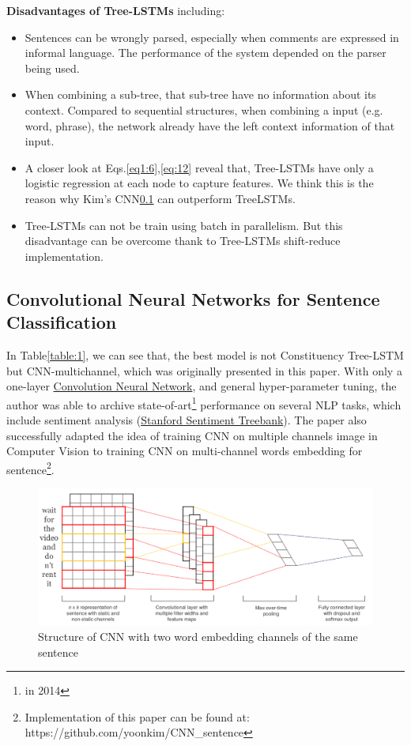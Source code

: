 \textbf{Disadvantages of Tree-LSTMs} including:\label{treelstm-drawback}
\begin{itemize}
\item Sentences can be wrongly parsed, especially when comments are expressed in informal language.
The performance of the system depended on the parser being used.
\item When combining a sub-tree, that sub-tree have no information about its context. 
Compared to sequential structures, when combining a input (e.g. word, phrase), the network already have the left context information of that input\cite{shift-reduce}.
\item A closer look at Eqs.\eqref{eq1:6},\eqref{eq:12} reveal that, Tree-LSTMs have only a logistic regression at each node to capture features.
We think this is the reason why Kim's CNN\ref{kim-cnn} can outperform TreeLSTMs.  
\item Tree-LSTMs can not be train using batch in parallelism. But this disadvantage can be overcome thank to Tree-LSTMs shift-reduce implementation\cite{shift-reduce}.
\end{itemize}


\subsection{Convolutional Neural Networks for Sentence Classification}\label{kim-cnn}
In Table\ref{table:1}, we can see that, the best model is not Constituency Tree-LSTM but CNN-multichannel\cite{KimCNN}, which was originally presented in this paper. 
With only a one-layer \hyperref[sec:cnn]{Convolution Neural Network}, and general hyper-parameter tuning, the author was able to archive state-of-art\footnote{in 2014} performance on several NLP tasks, which include sentiment analysis (\hyperref[sec:sst]{Stanford Sentiment Treebank}\cite{socher2013recursive}). 
The paper also successfully adapted the idea of training CNN on multiple channels image in Computer Vision to training CNN on multi-channel words embedding for sentence\footnote{Implementation of this paper can be found at: https://github.com/yoonkim/CNN\_sentence}.

\begin{figure}[H]
	\centering
	\includegraphics[scale=0.33]{figure/sentencecnn}
	\caption{Structure of CNN with two word embedding channels of the same sentence}
	\label{fig:multi-cnn}
\end{figure}

